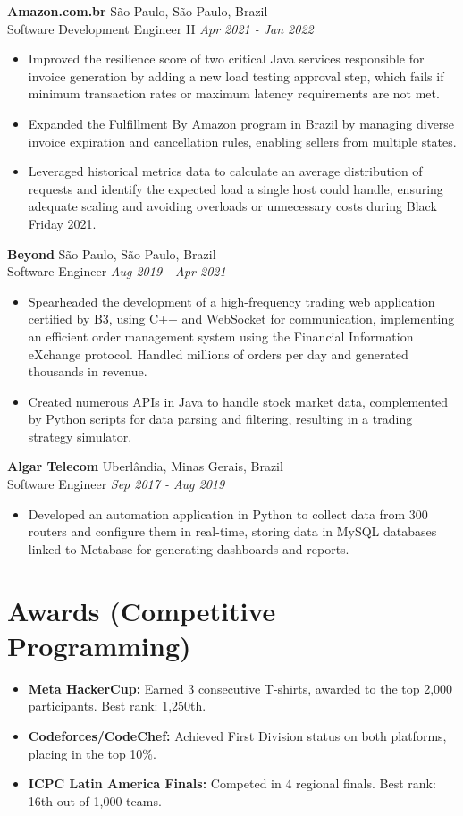 \documentclass[a4paper,10pt]{article}
\begin{document}
\textbf{Amazon.com.br} \hfill São Paulo, São Paulo, Brazil \\
Software Development Engineer II \hfill \textit{Apr 2021 - Jan 2022}
\begin{itemize}
    \item Improved the resilience score of two critical Java services responsible for invoice generation by adding a new load testing approval step, which fails if minimum transaction rates or maximum latency requirements are not met.
    \item Expanded the Fulfillment By Amazon program in Brazil by managing diverse invoice expiration and cancellation rules, enabling sellers from multiple states.
    \item Leveraged historical metrics data to calculate an average distribution of requests and identify the expected load a single host could handle, ensuring adequate scaling and avoiding overloads or unnecessary costs during Black Friday 2021.
\end{itemize}

\textbf{Beyond} \hfill São Paulo, São Paulo, Brazil \\
Software Engineer \hfill \textit{Aug 2019 - Apr 2021}
\begin{itemize}
    \item Spearheaded the development of a high-frequency trading web application certified by B3, using C++ and WebSocket for communication, implementing an efficient order management system using the Financial Information eXchange protocol. Handled millions of orders per day and generated thousands in revenue.
    \item Created numerous APIs in Java to handle stock market data, complemented by Python scripts for data parsing and filtering, resulting in a trading strategy simulator.
\end{itemize}

\textbf{Algar Telecom} \hfill Uberlândia, Minas Gerais, Brazil \\
Software Engineer \hfill \textit{Sep 2017 - Aug 2019}
\begin{itemize}
    \item Developed an automation application in Python to collect data from 300 routers and configure them in real-time, storing data in MySQL databases linked to Metabase for generating dashboards and reports.
\end{itemize}

\section*{Awards (Competitive Programming)}
\begin{itemize}
    \item \textbf{Meta HackerCup:} Earned 3 consecutive T-shirts, awarded to the top 2,000 participants. Best rank: 1,250th.
    \item \textbf{Codeforces/CodeChef:} Achieved First Division status on both platforms, placing in the top 10\%.
    \item \textbf{ICPC Latin America Finals:} Competed in 4 regional finals. Best rank: 16th out of 1,000 teams.
\end{itemize}
\end{document}
